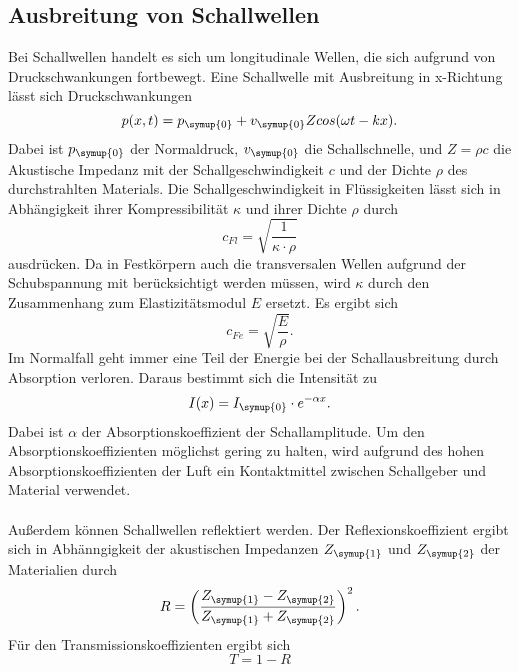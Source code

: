 \subsection{Ausbreitung von Schallwellen}
\label{sec:Schallwellen}
Bei Schallwellen handelt es sich um longitudinale Wellen, die sich aufgrund von Druckschwankungen fortbewegt.
Eine Schallwelle mit Ausbreitung in x-Richtung lässt sich Druckschwankungen
\begin{equation}
    p(x, t) = p_{\symup{0}} + v_{\symup{0}} Z cos(\omega t - kx).
\end{equation}
Dabei ist $p_{\symup{0}}$ der Normaldruck, $v_{\symup{0}}$ die Schallschnelle, und $Z=\rho c$ die Akustische
Impedanz mit der Schallgeschwindigkeit $c$ und der Dichte $\rho$ des durchstrahlten Materials.
Die Schallgeschwindigkeit in Flüssigkeiten lässt sich in Abhängigkeit ihrer Kompressibilität $\kappa$ und ihrer
Dichte $\rho$ durch
\begin{equation}
    c_{Fl} = \sqrt{\frac{1}{\kappa \cdot \rho}}
\end{equation}
ausdrücken. Da in Festkörpern auch die transversalen Wellen aufgrund der Schubspannung mit berücksichtigt werden
müssen, wird $\kappa$ durch den Zusammenhang zum Elastizitätsmodul $E$ ersetzt. Es ergibt sich
\begin{equation}
    c_{Fe} = \sqrt{\frac{E}{\rho}}.
\end{equation}
Im Normalfall geht immer eine Teil der Energie bei der Schallausbreitung durch Absorption verloren. Daraus bestimmt
sich die Intensität zu
\begin{equation}
    I(x) = I_{\symup{0}}\cdot e^{-\alpha x}.
\end{equation}
Dabei ist $\alpha$ der Absorptionskoeffizient der Schallamplitude. Um den Absorptionskoeffizienten möglichst
gering zu halten, wird aufgrund des hohen Absorptionskoeffizienten der Luft ein Kontaktmittel zwischen Schallgeber
und Material verwendet.\\
\\
Außerdem können Schallwellen reflektiert werden. Der Reflexionskoeffizient ergibt sich in Abhänngigkeit der
akustischen Impedanzen $Z_{\symup{1}}$ und $Z_{\symup{2}}$ der Materialien durch
\begin{equation}
    R = \left(\frac{Z_{\symup{1}}- Z_{\symup{2}}}{Z_{\symup{1}}+Z_{\symup{2}}}\right)^2 .
\end{equation}
Für den Transmissionskoeffizienten ergibt sich
\begin{equation}
    T = 1 - R
\end{equation}

